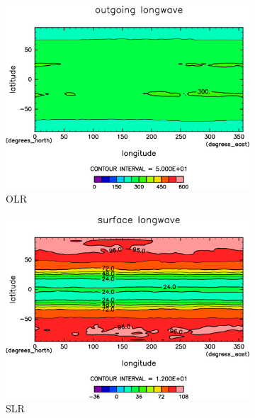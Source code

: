 \documentclass[body]{subfiles}
\begin{document}
\begin{figure}[t]
	\centering
	\begin{subfigure}{.4\textwidth}
		\centering
		\includegraphics[width=\textwidth]{S1366-nc/OLR,time=3650:4015-crop-rotate.pdf}
		\caption{OLR \hmu*{[W/m^{-2}]}}\label{S1366ncOLR}
	\end{subfigure}
	\begin{subfigure}{.4\textwidth}
		\centering
		\includegraphics[width=\textwidth]{S1366-nc/SLR,time=3650:4015-crop-rotate.pdf}
		\caption{SLR\hmu*{[W/m^{-2}]}}\label{S1366ncSLR}
	\end{subfigure}
	\begin{subfigure}{.4\textwidth}
		\centering

\end{subfigure}
\end{figure}
\end{document}
